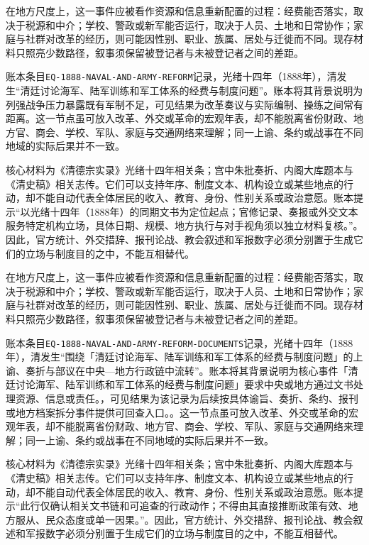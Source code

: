 在地方尺度上，这一事件应被看作资源和信息重新配置的过程：经费能否落实，取决于税源和中介；学校、警政或新军能否运行，取决于人员、土地和日常协作；家庭与社群对改革的经历，则可能因性别、职业、族属、居处与迁徙而不同。现存材料只照亮少数路径，叙事须保留被登记者与未被登记者之间的差距。

账本条目\texttt{EQ-1888-NAVAL-AND-ARMY-REFORM}记录，光绪十四年（1888年），清发生“清廷讨论海军、陆军训练和军工体系的经费与制度问题”。账本将其背景说明为列强战争压力暴露既有军制不足，可见结果为改革奏议与实际编制、操练之间常有距离。这一节点虽可放入改革、外交或革命的宏观年表，却不能脱离省份财政、地方官、商会、学校、军队、家庭与交通网络来理解；同一上谕、条约或战事在不同地域的实际后果并不一致。

核心材料为《清德宗实录》光绪十四年相关条；宫中朱批奏折、内阁大库题本与《清史稿》相关志传。它们可以支持年序、制度文本、机构设立或某些地点的行动，却不能自动代表全体居民的收入、教育、身份、性别关系或政治意愿。账本提示“以光绪十四年（1888年）的同期文书为定位起点；官修记录、奏报或外交文本服务特定机构立场，具体日期、规模、地方执行与对手视角须以独立材料复核。”。因此，官方统计、外交措辞、报刊论战、教会叙述和军报数字必须分别置于生成它们的立场与制度目的之中，不能互相替代。

在地方尺度上，这一事件应被看作资源和信息重新配置的过程：经费能否落实，取决于税源和中介；学校、警政或新军能否运行，取决于人员、土地和日常协作；家庭与社群对改革的经历，则可能因性别、职业、族属、居处与迁徙而不同。现存材料只照亮少数路径，叙事须保留被登记者与未被登记者之间的差距。

账本条目\texttt{EQ-1888-NAVAL-AND-ARMY-REFORM-DOCUMENTS}记录，光绪十四年（1888年），清发生“围绕「清廷讨论海军、陆军训练和军工体系的经费与制度问题」的上谕、奏折与部议在中央—地方行政链中流转”。账本将其背景说明为核心事件「清廷讨论海军、陆军训练和军工体系的经费与制度问题」要求中央或地方通过文书处理资源、信息或责任。，可见结果为该记录为后续按具体谕旨、奏折、条约、报刊或地方档案拆分事件提供可回查入口。。这一节点虽可放入改革、外交或革命的宏观年表，却不能脱离省份财政、地方官、商会、学校、军队、家庭与交通网络来理解；同一上谕、条约或战事在不同地域的实际后果并不一致。

核心材料为《清德宗实录》光绪十四年相关条；宫中朱批奏折、内阁大库题本与《清史稿》相关志传。它们可以支持年序、制度文本、机构设立或某些地点的行动，却不能自动代表全体居民的收入、教育、身份、性别关系或政治意愿。账本提示“此行仅确认相关文书链和可追查的行政动作；不得由其直接推断政策有效、地方服从、民众态度或单一因果。”。因此，官方统计、外交措辞、报刊论战、教会叙述和军报数字必须分别置于生成它们的立场与制度目的之中，不能互相替代。

